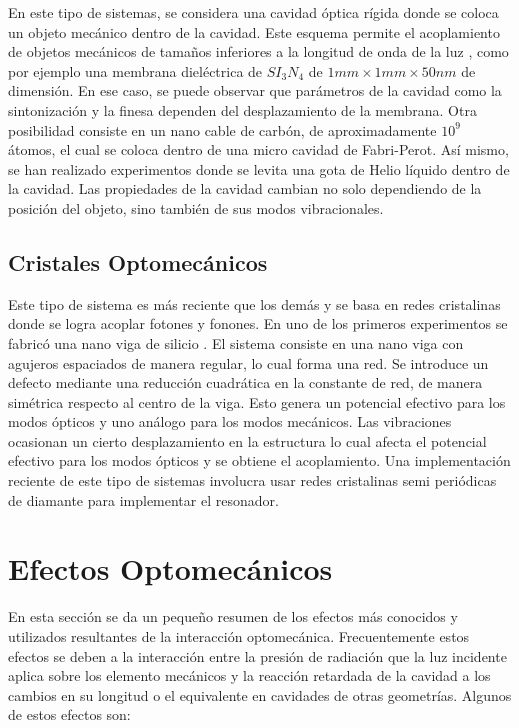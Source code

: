\documentclass[10pt,a4paper]{report}
\begin{document}
En este tipo de sistemas, se considera una cavidad óptica rígida donde
se coloca un objeto mecánico dentro de la cavidad. Este esquema
permite el acoplamiento de objetos mecánicos de tamaños inferiores a
la longitud de onda de la luz \cite{KippenberCO}, como por ejemplo una
membrana dieléctrica de $SI_3N_4$ de $1mm \times 1mm \times 50nm$ de
dimensión\cite{SankeyMC}. En ese caso, se puede observar que
parámetros de la cavidad como la sintonización y la finesa dependen
del desplazamiento de la membrana. Otra posibilidad consiste en un
nano cable de carbón, de aproximadamente $10^9$ átomos, el cual se
coloca dentro de una micro cavidad de Fabri-Perot. Así mismo, se han
realizado experimentos donde se levita una gota de Helio líquido
dentro de la cavidad\cite{ChildressLD}. Las propiedades de la cavidad
cambian no solo dependiendo de la posición del objeto, sino también de
sus modos vibracionales\cite{FaveroCR}.

\subsection{Cristales Optomecánicos}

Este tipo de sistema es más reciente que los demás y se basa en redes
cristalinas donde se logra acoplar fotones y fonones. En uno de los primeros
experimentos se fabricó una nano viga
de silicio \cite{EichenfieldOC}. El sistema consiste en una nano viga
con agujeros espaciados de manera regular, lo cual forma una red. Se
introduce un defecto mediante una reducción cuadrática en la constante
de red, de manera simétrica respecto al centro de la viga. Esto genera un
potencial efectivo para los modos ópticos y uno análogo para los modos
mecánicos. Las vibraciones ocasionan un cierto desplazamiento en la
estructura lo cual afecta el potencial efectivo para los modos ópticos
y se obtiene el acoplamiento. Una implementación reciente de este tipo
de sistemas involucra usar redes cristalinas semi periódicas de
diamante para implementar el resonador\cite{BurekDO}.

\section{Efectos Optomecánicos}

En esta sección se da un pequeño resumen de los efectos 
 más conocidos y utilizados resultantes de la interacción optomecánica. Frecuentemente estos efectos
se deben a la interacción entre la presión de radiación que la luz
incidente aplica sobre los elemento mecánicos y la reacción retardada
de la cavidad a los cambios en su longitud o el equivalente en cavidades de otras geometrías.
Algunos de estos efectos son:
\end{document}
